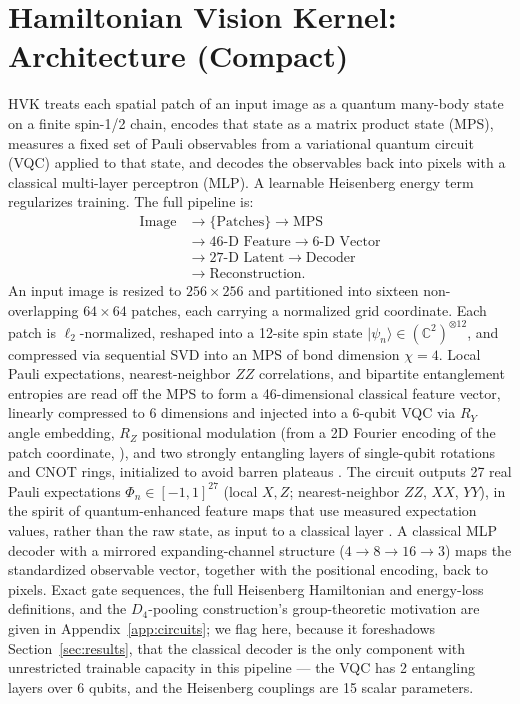 \documentclass[journal]{IEEEtran}
\begin{document}
\section{Hamiltonian Vision Kernel: Architecture (Compact)}
\label{sec:architecture}
HVK treats each spatial patch of an input image as a quantum many-body state on a finite spin-1/2 chain, encodes that state as a matrix product state (MPS), measures a fixed set of Pauli observables from a variational quantum circuit (VQC) applied to that state, and decodes the observables back into pixels with a classical multi-layer perceptron (MLP). A learnable Heisenberg energy term regularizes training. The full pipeline is:
\begin{equation}
\begin{aligned}
\text{Image} &\rightarrow \{\text{Patches}\} \rightarrow \text{MPS}\\
&\rightarrow \text{46-D Feature} \rightarrow \text{6-D Vector}\\
&\rightarrow \text{27-D Latent} \rightarrow \text{Decoder}\\
&\rightarrow \text{Reconstruction}.
\end{aligned}
\end{equation}
An input image is resized to $256\times256$ and partitioned into sixteen non-overlapping $64\times64$ patches, each carrying a normalized grid coordinate. Each patch is $\ell_2$-normalized, reshaped into a 12-site spin state $\lvert\psi_n\rangle \in (\mathbb{C}^2)^{\otimes 12}$, and compressed via sequential SVD into an MPS of bond dimension $\chi=4$. Local Pauli expectations, nearest-neighbor $ZZ$ correlations, and bipartite entanglement entropies are read off the MPS to form a 46-dimensional classical feature vector, linearly compressed to 6 dimensions and injected into a 6-qubit VQC via $R_Y$ angle embedding, $R_Z$ positional modulation (from a 2D Fourier encoding of the patch coordinate, \cite{Xu2021}), and two strongly entangling layers of single-qubit rotations and CNOT rings, initialized to avoid barren plateaus \cite{Cerezo2021, McClean2018}. The circuit outputs 27 real Pauli expectations $\Phi_n\in[-1,1]^{27}$ (local $X,Z$; nearest-neighbor $ZZ$, $XX$, $YY$), in the spirit of quantum-enhanced feature maps that use measured expectation values, rather than the raw state, as input to a classical layer \cite{Havlicek2019}. A classical MLP decoder with a mirrored expanding-channel structure ($4\to8\to16\to3$) maps the standardized observable vector, together with the positional encoding, back to pixels. Exact gate sequences, the full Heisenberg Hamiltonian and energy-loss definitions, and the $D_4$-pooling construction's group-theoretic motivation are given in Appendix~\ref{app:circuits}; we flag here, because it foreshadows Section~\ref{sec:results}, that the classical decoder is the only component with unrestricted trainable capacity in this pipeline --- the VQC has 2 entangling layers over 6 qubits, and the Heisenberg couplings are 15 scalar parameters.
\end{document}
